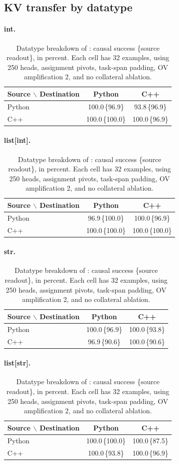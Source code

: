 \subsection{KV transfer by datatype}
\begin{table}[ht]\centering\small

\paragraph{int.}
\begin{tabular}{lcc}\toprule
Source $\backslash$ Destination & Python & C++\\\midrule
Python & 100.0\,\{96.9\} & 93.8\,\{96.9\}\\
C++ & 100.0\,\{100.0\} & 100.0\,\{96.9\}\\
\bottomrule\end{tabular}


\paragraph{list[int].}
\begin{tabular}{lcc}\toprule
Source $\backslash$ Destination & Python & C++\\\midrule
Python & 96.9\,\{100.0\} & 100.0\,\{96.9\}\\
C++ & 100.0\,\{100.0\} & 100.0\,\{100.0\}\\
\bottomrule\end{tabular}


\paragraph{str.}
\begin{tabular}{lcc}\toprule
Source $\backslash$ Destination & Python & C++\\\midrule
Python & 100.0\,\{96.9\} & 100.0\,\{93.8\}\\
C++ & 96.9\,\{90.6\} & 100.0\,\{90.6\}\\
\bottomrule\end{tabular}


\paragraph{list[str].}
\begin{tabular}{lcc}\toprule
Source $\backslash$ Destination & Python & C++\\\midrule
Python & 100.0\,\{100.0\} & 100.0\,\{87.5\}\\
C++ & 100.0\,\{93.8\} & 100.0\,\{96.9\}\\
\bottomrule\end{tabular}
\caption{Datatype breakdown of : causal success \{source readout\}, in percent. Each cell has 32 examples, using 250 heads, assignment pivots, task-span padding, OV amplification 2, and no collateral ablation.}
\label{tab:kv-datatypes}
\end{table}
